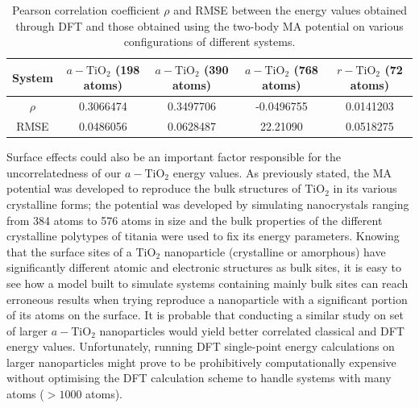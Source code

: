 \documentclass[aps,prb,twocolumn,amsmath,amssymb,superscriptaddress,longbibliography]{revtex4-1}
\newcommand\tab[1][1cm]{\hspace*{#1}} %
\begin{document}
\begin{table}[]
\begin{tabular}{c|c|c|c|c}
System & $a-\text{TiO}_2$ (198 atoms) & $a-\text{TiO}_2$ (390 atoms) & $a-\text{TiO}_2$ (768 atoms)  & $r-\text{TiO}_2$ (72 atoms) \\ \hline
$\rho$ & 0.3066474                    & 0.3497706                    & -0.0496755                   & 0.0141203                   \\
RMSE   & 0.0486056                    & 0.0628487                    & 22.21090                       & 0.0518275                   \\
\end{tabular}
\label{stats}
\caption{Pearson correlation coefficient $\rho$ and RMSE between the energy values obtained through DFT and those obtained using the two-body MA potential on various configurations of different systems.}
\end{table}


\tab Surface effects could also be an important factor responsible for the uncorrelatedness of our $a-\text{TiO}_2$ energy values.  
As previously stated, the MA potential was developed to reproduce the bulk structures of $\text{TiO}_2$ in its various crystalline forms; the potential was developed by simulating nanocrystals ranging from 384 atoms to 576 atoms in size and the bulk properties of the different crystalline polytypes of titania were used to fix its energy parameters\cite{MA_og}.
Knowing that the surface sites of a $\text{TiO}_2$ nanoparticle (crystalline or amorphous) have significantly different atomic and electronic structures as bulk sites\cite{vvh1,realistic_nnp,vvh2}, it is easy to see how a model built to simulate systems containing mainly bulk sites can reach erroneous results when trying reproduce a nanoparticle with a significant portion of its atoms on the surface.
It is probable that conducting a similar study on set of larger $a-\text{TiO}_2$ nanoparticles would yield better correlated classical and DFT energy values.
Unfortunately, running DFT single-point energy calculations on larger nanoparticles might prove to be prohibitively computationally expensive without optimising the DFT calculation scheme to handle systems with many atoms ($>1000$ atoms).
\end{document}

